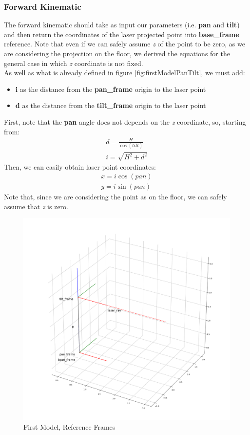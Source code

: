 \subsubsection{Forward Kinematic}
The forward kinematic should take as input our parameters (i.e. \textbf{pan} and \textbf{tilt}) and then return the coordinates of the laser projected point into \textbf{base\_frame} reference. Note that even if we can safely assume \textit{z} of the point to be zero, as we are considering the projection on the floor, we derived the equations for the general case in which \textit{z} coordinate is not fixed. \\
As well as what is already defined in figure \ref{fig:firstModelPanTilt}, we must add:
\begin{itemize}
    \item \textbf{i} as the distance from the \textbf{pan\_frame} origin to the laser point
    \item \textbf{d} as the distance from the \textbf{tilt\_frame} origin to the laser point
\end{itemize}
First, note that the \textbf{pan} angle does not depends on the \textit{z} coordinate, so, starting from:
\begin{align}
	d= \frac{H}{\cos{(tilt)}}\\
	i= \sqrt{H^2 + d^2}
\end{align}
Then, we can easily obtain laser point coordinates:
\begin{align}
	x= i\cos{(pan)}\\
	y= i\sin{(pan)}
\end{align}
Note that, since we are considering the point as on the floor, we can safely assume that \textit{z} is zero.
\begin{figure}
	\centering
	\includegraphics[width=\textwidth]{img/firstModel.png}%
	\caption{First Model, Reference Frames}
	\label{fig:firstModelRefFrame}
\end{figure}
